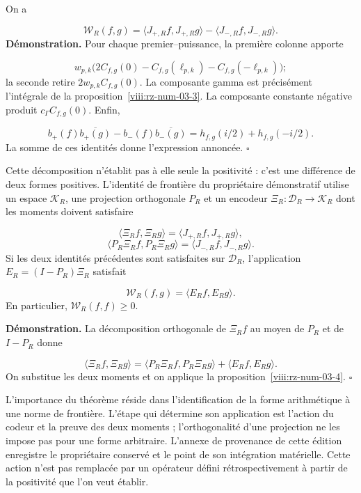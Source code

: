 On a

\[
\mathscr W_R(f,g)
=\langle J_{+,R}f,J_{+,R}g\rangle
-\langle J_{-,R}f,J_{-,R}g\rangle.
\]
\textbf{Démonstration.} Pour chaque premier–puissance, la première colonne apporte

\[
w_{p,k}\bigl(2C_{f,g}(0)
-C_{f,g}(\ell_{p,k})-C_{f,g}(-\ell_{p,k})\bigr);
\]
la seconde retire \(2w_{p,k}C_{f,g}(0)\). La composante gamma est précisément l'intégrale de la proposition~\ref{viii:rz-num-03-3}. La composante constante négative produit \(c_\Gamma C_{f,g}(0)\). Enfin,

\[
b_+(f)\overline{b_+(g)}-b_-(f)\overline{b_-(g)}
=h_{f,g}(i/2)+h_{f,g}(-i/2).
\]
La somme de ces identités donne l’expression annoncée. \hfill\(\square\)

Cette décomposition n’établit pas à elle seule la positivité : c’est une différence de deux formes positives. L’identité de frontière du propriétaire démonstratif utilise un espace \(\mathcal K_R\), une projection orthogonale \(P_R\) et un encodeur \(\Xi_R:\mathcal D_R\to\mathcal K_R\) dont les moments doivent satisfaire

\[
\langle\Xi_Rf,\Xi_Rg\rangle
=\langle J_{+,R}f,J_{+,R}g\rangle,
\]
\[
\langle P_R\Xi_Rf,P_R\Xi_Rg\rangle
=\langle J_{-,R}f,J_{-,R}g\rangle.
\]
Si les deux identités précédentes sont satisfaites sur \(\mathcal D_R\), l'application \(E_R=(I-P_R)\Xi_R\) satisfait

\[
\mathscr W_R(f,g)=\langle E_Rf,E_Rg\rangle.
\]
En particulier, \(\mathscr W_R(f,f)\geq0\).

\textbf{Démonstration.} La décomposition orthogonale de \(\Xi_Rf\) au moyen de \(P_R\) et de \(I-P_R\) donne

\[
\langle\Xi_Rf,\Xi_Rg\rangle
=\langle P_R\Xi_Rf,P_R\Xi_Rg\rangle
+\langle E_Rf,E_Rg\rangle.
\]
On substitue les deux moments et on applique la proposition~\ref{viii:rz-num-03-4}. \hfill\(\square\)

L'importance du théorème réside dans l'identification de la forme arithmétique à une norme de frontière. L'étape qui détermine son application est l'action du codeur et la preuve des deux moments ; l'orthogonalité d'une projection ne les impose pas pour une forme arbitraire. L'annexe de provenance de cette édition enregistre le propriétaire conservé et le point de son intégration matérielle. Cette action n'est pas remplacée par un opérateur défini rétrospectivement à partir de la positivité que l'on veut établir.

